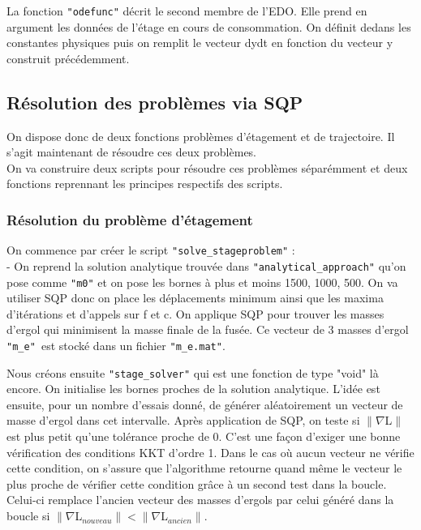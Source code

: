La fonction \texttt{"odefunc"} décrit le second membre de l'EDO. Elle prend en argument les données de l'étage en cours de consommation. On définit dedans les constantes physiques puis on remplit le vecteur dydt en fonction du vecteur y construit précédemment.\medbreak

\subsection{Résolution des problèmes via SQP}\medbreak
On dispose donc de deux fonctions problèmes d'étagement et de trajectoire. Il s'agit maintenant de résoudre ces deux problèmes.\\
On va construire deux scripts pour résoudre ces problèmes séparémment et deux fonctions reprennant les principes respectifs des scripts.\medbreak


\subsubsection{Résolution du problème d'étagement}\medbreak

On commence par créer le script \texttt{"solve\_stageproblem"} : \\
\indent - On reprend la solution analytique trouvée dans \texttt{"analytical\_approach"} qu'on pose comme \texttt{"m0"} et on pose les bornes à plus et moins 1500, 1000, 500. On va utiliser SQP donc on place les déplacements minimum ainsi que les maxima d'itérations et d'appels sur f et c. On applique SQP pour trouver les masses d'ergol qui minimisent la masse finale de la fusée. Ce vecteur de 3 masses d'ergol \texttt{"m\_e" }est stocké dans un fichier \texttt{"m\_e.mat"}.\medbreak

Nous créons ensuite \texttt{"stage\_solver"} qui est une fonction de type "void" là encore. On initialise les bornes proches de la solution analytique. L'idée est ensuite, pour un nombre d'essais donné, de générer aléatoirement un vecteur de masse d'ergol dans cet intervalle. Après application de SQP, on teste si $\|    \nabla $L$   \|$ est plus petit qu'une tolérance proche de 0. C'est une façon d'exiger une bonne vérification des conditions KKT d'ordre 1. Dans le cas où aucun vecteur ne vérifie cette condition, on s'assure que l'algorithme retourne quand même le vecteur le plus proche de vérifier cette condition grâce à un second test dans la boucle. Celui-ci remplace l'ancien vecteur des masses d'ergols par celui généré dans la boucle si $\|    \nabla $L$_{nouveau}   \| < \|    \nabla $L$_{ancien}   \|$.\medbreak


